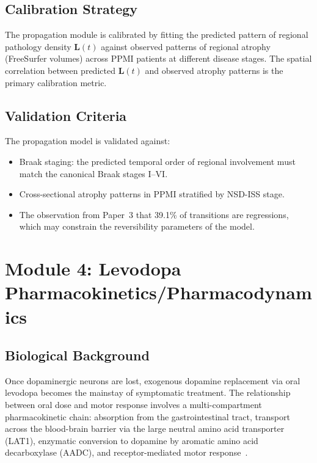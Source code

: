 \subsection{Calibration Strategy}

The propagation module is calibrated by fitting the predicted pattern of regional pathology density $\mathbf{L}(t)$ against observed patterns of regional atrophy (FreeSurfer volumes) across PPMI patients at different disease stages. The spatial correlation between predicted $\mathbf{L}(t)$ and observed atrophy patterns is the primary calibration metric.

\subsection{Validation Criteria}

The propagation model is validated against:
\begin{itemize}
\item Braak staging: the predicted temporal order of regional involvement must match the canonical Braak stages I--VI.
\item Cross-sectional atrophy patterns in PPMI stratified by NSD-ISS stage.
\item The observation from Paper~3 that 39.1\% of transitions are regressions, which may constrain the reversibility parameters of the model.
\end{itemize}


\section{Module 4: Levodopa Pharmacokinetics/Pharmacodynamics}
\label{sec:mech-pkpd}

\subsection{Biological Background}

Once dopaminergic neurons are lost, exogenous dopamine replacement via oral levodopa becomes the mainstay of symptomatic treatment. The relationship between oral dose and motor response involves a multi-compartment pharmacokinetic chain: absorption from the gastrointestinal tract, transport across the blood-brain barrier via the large neutral amino acid transporter (LAT1), enzymatic conversion to dopamine by aromatic amino acid decarboxylase (AADC), and receptor-mediated motor response~\cite{ursino2020}.

